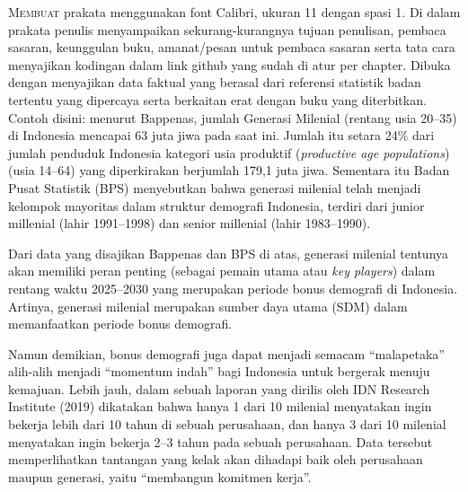 \documentclass{bukupedia}
\begin{document}
\coverdepan

\halamanjudul
\halamanredaksi

\frontmatter


\lettrine[lines=3, findent=2pt, nindent=0pt]{M}{embuat} prakata menggunakan font Calibri, ukuran 11 dengan spasi 1. Di
dalam prakata penulis menyampaikan sekurang-kurangnya tujuan penulisan,
pembaca sasaran, keunggulan buku, amanat/pesan untuk pembaca sasaran
serta tata cara menyajikan kodingan dalam link github yang sudah di atur
per chapter. Dibuka dengan menyajikan data faktual yang berasal dari
referensi statistik badan tertentu yang dipercaya serta berkaitan erat
dengan buku yang diterbitkan. Contoh disini: menurut Bappenas, jumlah
Generasi Milenial (rentang usia 20--35) di Indonesia mencapai 63 juta
jiwa pada saat ini. Jumlah itu setara 24\% dari jumlah penduduk Indonesia
kategori usia produktif (\textit{productive age populations}) (usia
14--64) yang diperkirakan berjumlah 179,1 juta jiwa. Sementara itu Badan
Pusat Statistik (BPS) menyebutkan bahwa generasi milenial telah menjadi
kelompok mayoritas dalam struktur demografi Indonesia, terdiri dari
junior millenial (lahir 1991--1998) dan senior millenial (lahir
1983--1990).

Dari data yang disajikan Bappenas dan BPS di atas, generasi milenial
tentunya akan memiliki peran penting (sebagai pemain utama atau
\textit{key players}) dalam rentang waktu 2025--2030 yang merupakan
periode bonus demografi di Indonesia. Artinya, generasi milenial
merupakan sumber daya utama (SDM) dalam memanfaatkan periode bonus
demografi.

Namun demikian, bonus demografi juga dapat menjadi semacam
``malapetaka'' alih-alih menjadi ``momentum indah'' bagi Indonesia untuk
bergerak menuju kemajuan. Lebih jauh, dalam sebuah laporan yang dirilis
oleh IDN Research Institute (2019) dikatakan bahwa hanya 1 dari 10
milenial menyatakan ingin bekerja lebih dari 10 tahun di sebuah
perusahaan, dan hanya 3 dari 10 milenial menyatakan ingin bekerja 2--3
tahun pada sebuah perusahaan. Data tersebut memperlihatkan tantangan
yang kelak akan dihadapi baik oleh perusahaan maupun generasi, yaitu
``membangun komitmen kerja''.
\end{document}
